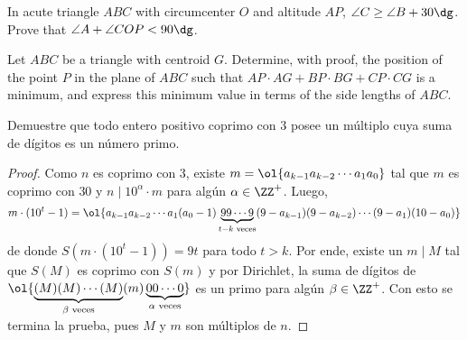 \begin{probMG}[ISL 2001/G2]
  In acute triangle $ABC$ with circumcenter $O$ and altitude $AP$,
  $\angle C\ge\angle B+30\dg$. Prove that $\angle A+\angle COP<90\dg$.
\end{probMG}

\begin{probMR}[ISL 2001/G3]
  Let $ABC$ be a triangle with centroid $G$. Determine, with proof, the position
  of the point $P$ in the plane of $ABC$ such that
  $AP\cdot AG+BP\cdot BG+CP\cdot CG$ is a minimum, and express this minimum
  value in terms of the side lengths of $ABC$.
\end{probMR}


\begin{probEG}
  Demuestre que todo entero positivo coprimo con $3$ posee un múltiplo cuya suma
  de dígitos es un número primo.
\end{probEG}

\begin{proof}
  Como $n$ es coprimo con $3$, existe $m=\ol{a_{k-1}a_{k-2}\cdots a_1a_0}$ tal
  que $m$ es coprimo con $30$ y $n\mid 10^\alpha\cdot m$ para algún
  $\alpha\in\ZZ^+$. Luego,
  \[
    m\cdot(10^t-1)
    =\ol{a_{k-1}a_{k-2}\cdots a_1(a_0-1)\underbrace{99\cdots 9}_{t-k\text{ veces}}(9-a_{k-1})(9-a_{k-2})\cdots(9-a_1)(10-a_0)}
  \]
  de donde $S(m\cdot(10^t-1))=9t$ para todo $t>k$. Por ende, existe un $m\mid M$
  tal que $S(M)$ es coprimo con $S(m)$ y por Dirichlet, la suma de dígitos de
  $\ol{\underbrace{(M)(M)\cdots (M)}_{\beta\text{ veces}}(m)\underbrace{00\cdots 0}_{\alpha\text{ veces}}}$
  es un primo para algún $\beta\in\ZZ^+$. Con esto se termina la prueba, pues
  $M$ y $m$ son múltiplos de $n$.
\end{proof}
